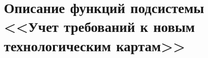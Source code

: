 \section{Описание функций подсистемы <<Учет требований к новым технологическим картам>>}

% 

% 

%

%



% 
% 




% 



